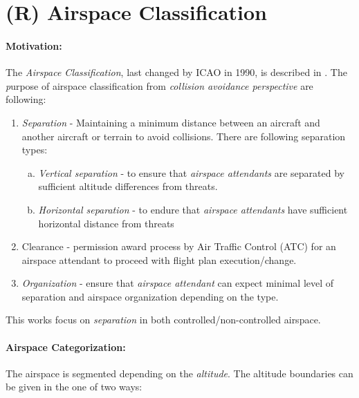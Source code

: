 \section{(R) Airspace Classification}\label{sec:AirspaceClassification}
\paragraph{Motivation:} The \emph{Airspace Classification}, last changed by ICAO in 1990, is described in \cite{icaoAnnex11}. The \emph purpose of airspace classification from \emph{collision avoidance perspective} are following:

\begin{enumerate}
    \item \emph{Separation} - Maintaining a minimum distance between an aircraft and another aircraft or terrain to avoid collisions. There are following separation types:
    \begin{enumerate}[a.]
        \item \emph{Vertical separation} - to ensure that \emph{airspace attendants} are separated by sufficient altitude differences from threats.
        
        \item \emph{Horizontal  separation} - to endure that \emph{airspace attendants} have sufficient horizontal distance from threats
    \end{enumerate}
    
    \item{Clearance} - permission award process by Air Traffic Control (ATC) for an airspace attendant to proceed with flight plan execution/change.
    
    \item \emph{Organization} - ensure that \emph{airspace attendant} can expect minimal level of separation and airspace organization depending on the type.
\end{enumerate}

\begin{note}
    This works focus on \emph{separation} in both controlled/non-controlled airspace.
\end{note}

\paragraph{Airspace Categorization:} The airspace is segmented depending on the \emph{altitude}. The altitude boundaries can be given in the one of two ways:

